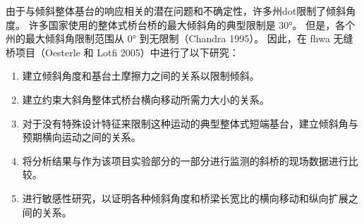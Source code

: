 由于与倾斜整体基台的响应相关的潜在问题和不确定性，许多州\acrlong*{dot}限制了倾斜角度。 许多国家使用的整体式桥台桥的最大倾斜角的典型限制是 \ang{30}。 但是，各个州的最大倾斜角限制范围从 \ang{0} 到无限制（Chandra 1995）。 因此，在 \acrshort*{fhwa} 无缝桥项目（Oesterle 和 Lotfi 2005）中进行了以下研究：

\begin{enumerate}
  \item 建立倾斜角度和基台土摩擦力之间的关系以限制倾斜。
  \item 建立约束大斜角整体式桥台横向移动所需力大小的关系。
  \item 对于没有特殊设计特征来限制这种运动的典型整体式短端基台，建立倾斜角与预期横向运动之间的关系。
  \item 将分析结果与作为该项目实验部分的一部分进行监测的斜桥的现场数据进行比较。
  \item 进行敏感性研究，以证明各种倾斜角度和桥梁长宽比的横向移动和纵向扩展之间的关系。
\end{enumerate}

